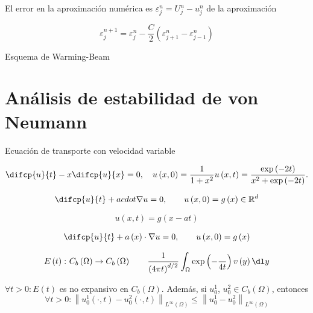 El error en la aproximación numérica es $\varepsilon^{n}_{j}=U^{n}_{j}-u^{n}_{j}$ de la aproximación

\begin{equation*}
    \varepsilon^{n+1}_{j}=
    \varepsilon^{n}_{j}-
    \dfrac{C}{2}
    \left(\varepsilon^{n}_{j+1}-\varepsilon^{n}_{j-1}\right)
\end{equation*}

Esquema de Warming-Beam

\section*{Análisis de estabilidad de von Neumann}


Ecuación de transporte con velocidad variable

\begin{equation*}
    \difcp{u}{t}-
    x\difcp{u}{x}=0,\quad
    u\left(x,0\right)=
    \dfrac{1}{1+x^{2}}
    u\left(x,t\right)=
    \dfrac{\exp\left(-2t\right)}{x^{2}+\exp\left(-2t\right)}.
\end{equation*}

\begin{equation*}
    \difcp{u}{t}+
    a
    cdot
    \nabla u=0,\qquad
    u\left(x,0\right)=g\left(x\right)\in\mathbb{R}^{d}
\end{equation*}

\begin{equation*}
    u\left(x,t\right)=
    g\left(x-at\right)
\end{equation*}

\begin{equation*}
    \difcp{u}{t}+
    a\left(x\right)\cdot
    \nabla u=0,\qquad
    u\left(x,0\right)=
    g\left(x\right)
\end{equation*}

\begin{equation*}
    E\left(t\right)\colon C_{b}\left(\Omega\right)\to C_{b}\left(\Omega\right)\qquad
    \dfrac{1}{{\left(4\pi t\right)}^{d/2}}
    \int_{\Omega}
    \exp\left(-\dfrac{}{4t}\right)
    v\left(y\right)
    \dl y
\end{equation*}

\begin{theorem}[No expansividad]
    \begin{math}
        \forall t>0:
        E\left(t\right)
    \end{math}
    es no expansivo en $C_{b}\left(\Omega\right)$.
    Además, si $u^{1}_{0}$, $u^{2}_{0}\in C_{b}\left(\Omega\right)$, entonces
    \begin{equation*}
        \forall t>0:
        {\left\|
        u^{1}_{0}\left(\cdot, t\right)-u^{2}_{0}\left(\cdot, t\right)
        \right\|}_{L^{\infty}\left(\Omega\right)}\leq
        {\left\|
        u^{1}_{0}-u^{2}_{0}
        \right\|}_{L^{\infty}\left(\Omega\right)}
    \end{equation*}
\end{theorem}

